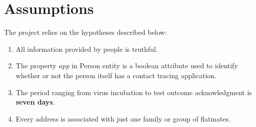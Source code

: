 \section{Assumptions}
The project relies on the hypotheses described below:

\begin{enumerate}
    \item All information provided by people is truthful.
    \item The property \textit{app} in Person entity is a boolean attribute used to identify whether or not the person itself has a contact tracing application.
    \item The period ranging from virus incubation to test outcome acknowledgment is \textbf{seven days}.
    \item Every address is associated with just one family or group of flatmates.
\end{enumerate}